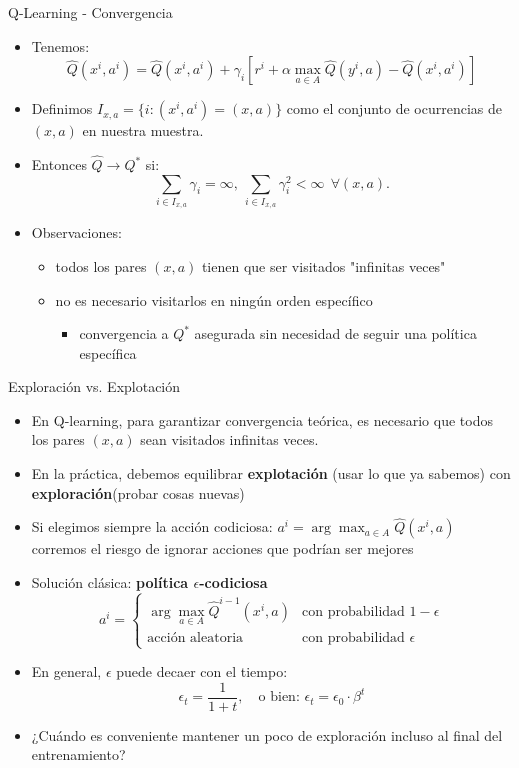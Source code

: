 \documentclass[handout]{beamer}
\begin{document}
\begin{frame}{Q-Learning - Convergencia}
\begin{itemize}
\item Tenemos: 
$$
\hat Q(x^i,a^i) = \hat Q(x^i,a^i) + \gamma_i\left[ r^i +\alpha \max\limits_{a \in A}\hat Q(y^i,a)-\hat Q(x^i,a^i)\right]
$$
\item<2-> Definimos $I_{x,a} = \{i: (x^i,a^i) = (x,a)\}$ como el conjunto de ocurrencias de $(x,a)$ en nuestra muestra.

\item<3-> Entonces $\hat Q \rightarrow Q^*$ si:
$$
\sum_{i \in I_{x,a}} \gamma_i = \infty, ~\sum_{i \in I_{x,a}} \gamma_i^2  <\infty~~\forall (x,a).
$$
\item<4-> Observaciones:
\begin{itemize}
\item<5-> todos los pares $(x,a)$ tienen que ser visitados "infinitas veces"
\item<6-> no es necesario visitarlos en ningún orden específico
\begin{itemize}
\item<7-> convergencia a $Q^*$ asegurada sin necesidad de seguir una política específica
\end{itemize}
\end{itemize}
\end{itemize}
\end{frame}

\begin{frame}{Exploración vs. Explotación}
\begin{itemize}
\item<1-> En Q-learning, para garantizar convergencia teórica, es necesario que todos los pares $(x, a)$ sean visitados infinitas veces.
\item<2-> En la práctica, debemos equilibrar
\textbf{explotación} (usar lo que ya sabemos)  con \textbf{exploración}(probar cosas nuevas)
\item<3-> Si elegimos siempre la acción codiciosa:
$a^i = \arg\max_{a \in A} \hat Q(x^i,a)$
corremos el riesgo de ignorar acciones que podrían ser mejores
\item<4-> Solución clásica: \textbf{política \(\epsilon\)-codiciosa}
$$
a^i = \begin{cases}
\arg\max\limits_{a \in A} \hat Q^{i-1}(x^i,a) & \text{con probabilidad } 1 - \epsilon \\
\text{acción aleatoria} & \text{con probabilidad } \epsilon
\end{cases}
$$
\item<5-> En general, \(\epsilon\) puede decaer con el tiempo:
\[
\epsilon_t = \frac{1}{1 + t},\quad \text{o bien: } \epsilon_t = \epsilon_0 \cdot \beta^t
\]
\item<6->{¿Cuándo es conveniente mantener un poco de exploración incluso al final del entrenamiento?}
\end{itemize}

\end{frame}
\end{document}
